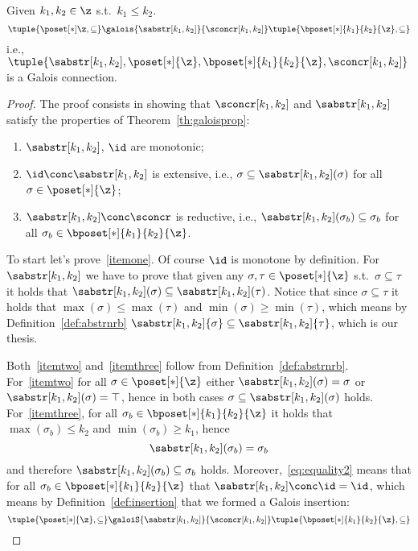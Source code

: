 \begin{lemma}
  Given \(k_1, k_2 \in \z\) s.t.\ \(k_1\leq k_2\).
  \begin{equation*}
    \tuple{\poset[*]\z, \subseteq} \galois{\sabstr[k_1,k_2]}{\sconcr[k_1,k_2]} \tuple{\bposet[*]{k_1}{k_2}{\z}, \subseteq}
  \end{equation*}
  i.e.,
  \(\tuple{\sabstr[k_1,k_2], \poset[*]{\z},
    {\bposet[*]{k_1}{k_2}{\z}}, \sconcr[k_1,k_2]}\) is a Galois connection.
\end{lemma} 

\begin{proof}
  The proof consists in showing that \(\sconcr[k_1,k_2]\) and
  \(\sabstr[k_1,k_2]\) satisfy the properties of
  Theorem~\ref{th:galoisprop}:
  \begin{enumerate}[label={(\arabic*)}]
  \item\label{itemone} \(\sabstr[k_1,k_2]\), \(\id\) are monotonic;
  \item\label{itemtwo} \(\id \conc \sabstr[k_1, k_2]\) is extensive, i.e.,
    \(\sigma \subseteq \sabstr[k_1,k_2](\sigma)\) for all
    \(\sigma \in \poset[*]{\z}\);
  \item\label{itemthree} \(\sabstr[k_1,k_2] \conc\sconcr\) is reductive, i.e.,
    \(\sabstr[k_1,k_2](\sigma_b) \subseteq \sigma_b\) for all
    \(\sigma_b \in \bposet[*]{k_1}{k_2}{\z}\).
  \end{enumerate}
  To start let's prove~\ref{itemone}. Of course \(\id\) is monotone by
  definition. For \(\sabstr[k_1,k_2]\) we have to prove that given any
  \(\sigma, \tau \in \poset[*]{\z}\) s.t.\ \(\sigma \subseteq \tau\)
  it holds that
  \(\sabstr[k_1,k_2](\sigma) \subseteq \sabstr[k_1,k_2](\tau)\). Notice
  that since \(\sigma \subseteq \tau\) it holds that
  \(\max(\sigma) \leq \max(\tau)\) and
  \(\min(\sigma) \geq \min(\tau)\), which means by
  Definition~\ref{def:abstrnrb}
  \(\sabstr[k_1,k_2]{\sigma} \subseteq \sabstr[k_1,k_2]{\tau}\), which
  is our thesis.

  \medskip

  \noindent
  Both~\ref{itemtwo} and~\ref{itemthree} follow from
  Definition~\ref{def:abstrnrb}. For~\ref{itemtwo} for all
  \(\sigma \in \poset[*]{\z}\) either
  \(\sabstr[k_1,k_2]({\sigma}) = \sigma\) or
  \(\sabstr[k_1,k_2]({\sigma}) = \top\), hence in both cases
  \(\sigma \subseteq \sabstr[k_1,k_2]({\sigma})\)
  holds. For~\ref{itemthree}, for all
  \(\sigma_b \in \bposet[*]{k_1}{k_2}{\z}\) it holds that
  \(\max(\sigma_b) \leq k_2\) and \(\min(\sigma_b) \geq k_1\), hence
  \begin{equation}\label{eq:equality2}
    \sabstr[k_1,k_2]({\sigma_b}) = \sigma_b
  \end{equation}
  and therefore \(\sabstr[k_1,k_2]({\sigma_b}) \subseteq \sigma_b\)
  holds.  Moreover,~\eqref{eq:equality2} means that for all
  \(\sigma_b \in \bposet[*]{k_1}{k_2}{\z}\) that
  \(\sabstr[k_1,k_2] \conc \id = \id\), which means by
  Definition~\ref{def:insertion} that we formed a Galois insertion:
  \begin{equation*}
    \tuple{\poset[*]{\z}, \subseteq}
    \galoiS{\sabstr[k_1,k_2]}{\sconcr[k_1,k_2]}
    \tuple{\bposet[*]{k_1}{k_2}{\z}, \subseteq}
    \qedhere
  \end{equation*}
\end{proof}
